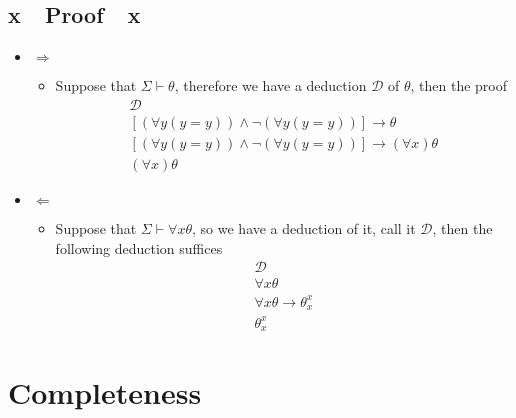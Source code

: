 \begin{tcolorbox}
\section*{x~\xrfill[0.3ex]{1.5pt}~Proof~\xrfill[0.3ex]{1.5pt}~x}
\begin{itemize}
    \item $ \Rightarrow $ 
    \begin{itemize}
        \item Suppose that $ \Sigma \vdash \theta$, therefore we have a deduction $ \mathcal{D}$ of $ \theta$, then the proof
            \begin{gather*}
                \mathcal{D}\\
                \left[ \left( \forall y \left( y =  y \right) \right) \land  \neg \left( \forall y \left( y =  y \right) \right) \right] \rightarrow \theta \tag{taut. PC}\\
                \left[ \left( \forall y \left( y =  y \right) \right) \land  \neg \left( \forall y \left( y =  y \right) \right) \right] \rightarrow \left(  \forall  x \right)\theta \tag{QR}\\
                \left(  \forall x \right) \theta \tag{PC}
            \end{gather*}
    \end{itemize}
    \item $ \Leftarrow $
    \begin{itemize}
        \item Suppose that $ \Sigma \vdash \forall x \theta$, so we have a deduction of it, call it  $\mathcal{D}$, then the following deduction suffices
        \begin{gather*}
           \mathcal{D} \\
           \forall x \theta\\
           \forall x \theta \rightarrow \theta _{x}^{x}\\
            \theta _{x}^{x}
        \end{gather*}
    \end{itemize}
\end{itemize}

\end{tcolorbox}


\section{Completeness}

